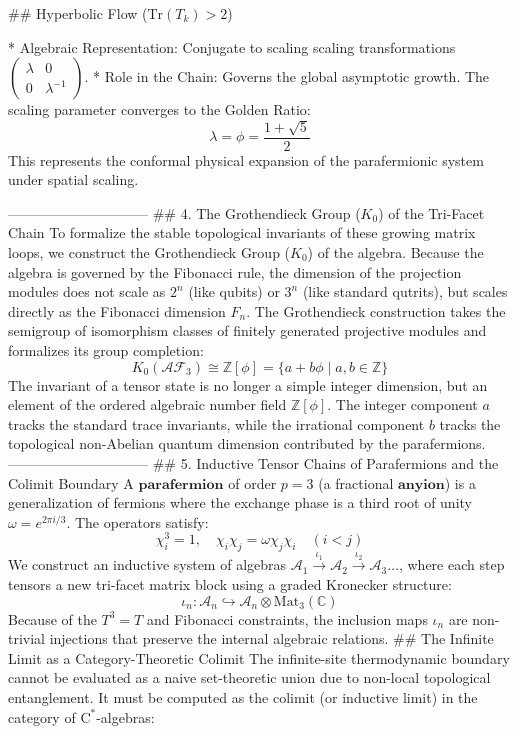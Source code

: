 ## Hyperbolic Flow ($\text{Tr}(T_k) > 2$)

* Algebraic Representation: Conjugate to scaling scaling transformations $\begin{pmatrix} \lambda & 0 \\ 0 & \lambda^{-1} \end{pmatrix}$.
* Role in the Chain: Governs the global asymptotic growth. The scaling parameter converges to the Golden Ratio:
$$\lambda = \phi = \frac{1+\sqrt{5}}{2}$$ 
This represents the conformal physical expansion of the parafermionic system under spatial scaling.

------------------------------
## 4. The Grothendieck Group ($K_0$) of the Tri-Facet Chain
To formalize the stable topological invariants of these growing matrix loops, we construct the Grothendieck Group ($K_0$) of the algebra.
Because the algebra is governed by the Fibonacci rule, the dimension of the projection modules does not scale as $2^n$ (like qubits) or $3^n$ (like standard qutrits), but scales directly as the Fibonacci dimension $F_n$.
The Grothendieck construction takes the semigroup of isomorphism classes of finitely generated projective modules and formalizes its group completion:
$$K_0(\mathcal{AF}_3) \cong \mathbb{Z}[\phi] = \{ a + b\phi \mid a, b \in \mathbb{Z} \}$$ 
The invariant of a tensor state is no longer a simple integer dimension, but an element of the ordered algebraic number field $\mathbb{Z}[\phi]$. The integer component $a$ tracks the standard trace invariants, while the irrational component $b$ tracks the topological non-Abelian quantum dimension contributed by the parafermions.
------------------------------
## 5. Inductive Tensor Chains of Parafermions and the Colimit Boundary
A $\textbf{parafermion}$ of order $p=3$ (a fractional $\textbf{anyion}$) is a generalization of fermions where the exchange phase is a third root of unity $\omega = e^{2\pi i / 3}$. The operators satisfy:
$$\chi_i^3 = 1, \quad \chi_i \chi_j = \omega \chi_j \chi_i \quad (i < j)$$ 
We construct an inductive system of algebras $\mathcal{A}_1 \xrightarrow{\iota_1} \mathcal{A}_2 \xrightarrow{\iota_2} \mathcal{A}_3 \dots$, where each step tensors a new tri-facet matrix block using a graded Kronecker structure:
$$\iota_n: \mathcal{A}_n \hookrightarrow \mathcal{A}_n \otimes \text{Mat}_3(\mathbb{C})$$ 
Because of the $T^3=T$ and Fibonacci constraints, the inclusion maps $\iota_n$ are non-trivial injections that preserve the internal algebraic relations.
## The Infinite Limit as a Category-Theoretic Colimit
The infinite-site thermodynamic boundary cannot be evaluated as a naive set-theoretic union due to non-local topological entanglement. It must be computed as the colimit (or inductive limit) in the category of $\text{C}^*$-algebras:
